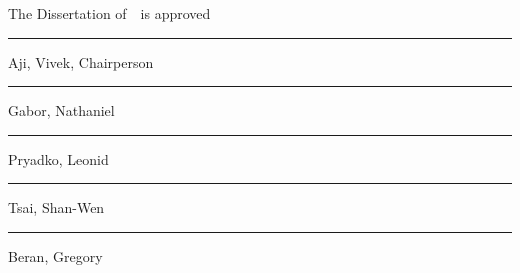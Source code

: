 \newcommand{\signatureblock}[1]{%
  \begin{minipage}{10cm}
    \hrule\smallskip #1
  \end{minipage}
}

\clearpage
\thispagestyle{empty}
\centering
\vspace*{-\toptafiddle}

The Dissertation of~\theauthor~is approved

\vfill

\signatureblock{Aji, Vivek, Chairperson}
\vfill
\signatureblock{Gabor, Nathaniel}
\vfill
\signatureblock{Pryadko, Leonid }
\vfill
\signatureblock{Tsai, Shan-Wen}
\vfill
\signatureblock{Beran, Gregory}

\vfill

\textsc{\theuniversity}

\enlargethispage{\bottafiddle}
\clearpage
